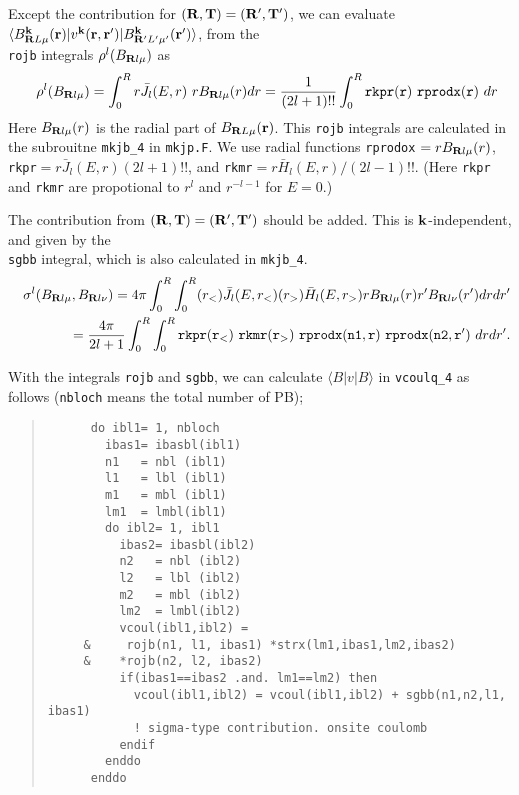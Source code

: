 \documentclass[a4paper,10pt,epsf,fleqn]{article}
\newcommand{\bfk}{{\bf k}}
\newcommand{\bfr}{{\bf r}}
\newcommand{\bfT}{{\bf T}}
\newcommand{\bfR}{{\bf R}}
\newcommand{\req}[1]{\mbox{Eq.~(\ref{#1})}}
\begin{document}
Except the contribution for $(\bfR,\bfT)=(\bfR',\bfT')$,
we can evaluate
$\langle B^\bfk_{\bfR{L}\mu}(\bfr)|v^\bfk(\bfr,\bfr')|B^\bfk_{\bfR'{L'}\mu'}(\bfr') \rangle$, from the\\ \verb#rojb# integrals $\rho^l(B_{\bfR{l}\mu})$  as
\begin{eqnarray}
&&\rho^l(B_{\bfR{l}\mu})=
\int_0^{R} r\bar{J}_l(E,r) \ r B_{\bfR{l}\mu}(r)  dr
= \frac{1}{(2l+1)!!}\int_0^{R} {\tt rkpr(r) \ rprodx(r)} \ dr
\end{eqnarray}
Here $B_{\bfR{l}\mu}(r)$ is the radial part of $B_{\bfR{L}\mu}(\bfr)$.
This \verb!rojb! integrals are calculated in 
the subrouitne \verb!mkjb_4! in \verb#mkjp.F#.
We use radial functions 
\verb!rprodox! $=r B_{\bfR{l}\mu}(r)$, 
\verb!rkpr!$=r\bar{J}_l(E,r)(2l+1)!!$, 
and \verb!rkmr!$=r\bar{H}_l(E,r)/(2l-1)!!$.
(Here \verb!rkpr! and \verb!rkmr! are propotional to
$r^l$ and $r^{-l-1}$ for $E =0$.)

The contribution from $(\bfR,\bfT)=(\bfR',\bfT')$
should be added. This is $\bfk$-independent, and
given by the\\ \verb!sgbb! integral, which is also calculated in \verb!mkjb_4!.
\begin{eqnarray}
&&\sigma^l(B_{\bfR{l}\mu},B_{\bfR{l}\nu})=
{4\pi}
\int_0^{R}\int_0^{R} (r_<)\bar{J}_l(E,r_<) (r_>)\bar{H}_l(E,r_>)
r B_{\bfR{l}\mu}(r) r' B_{\bfR{l}\nu}(r') dr dr' \nonumber \\
&&=\frac{4\pi}{2l+1}
\int_0^{R}\int_0^{R} {\tt rkpr(r_<) \ rkmr(r_>) \ rprodx(n1,r) \ rprodx(n2, r')} 
\ dr dr'.
\end{eqnarray}

With the integrals \verb#rojb# and \verb#sgbb#, we can calculate
$\langle B|v|B \rangle$ in \verb!vcoulq_4! as follows
(\verb!nbloch! means the total number of PB);
\begin{quote}
{\baselineskip=3mm
\begin{verbatim}
      do ibl1= 1, nbloch
        ibas1= ibasbl(ibl1)
        n1   = nbl (ibl1)
        l1   = lbl (ibl1)
        m1   = mbl (ibl1)
        lm1  = lmbl(ibl1)
        do ibl2= 1, ibl1
          ibas2= ibasbl(ibl2)
          n2   = nbl (ibl2)
          l2   = lbl (ibl2)
          m2   = mbl (ibl2)
          lm2  = lmbl(ibl2)
          vcoul(ibl1,ibl2) =
     &     rojb(n1, l1, ibas1) *strx(lm1,ibas1,lm2,ibas2)
     &    *rojb(n2, l2, ibas2)
          if(ibas1==ibas2 .and. lm1==lm2) then
            vcoul(ibl1,ibl2) = vcoul(ibl1,ibl2) + sgbb(n1,n2,l1, ibas1)
            ! sigma-type contribution. onsite coulomb
          endif
        enddo
      enddo
\end{verbatim}}
\end{quote}
\end{document}
